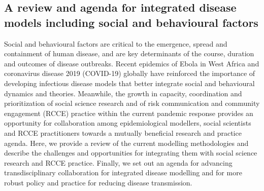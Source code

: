 \documentclass[a4paper,11pt]{scrartcl}
\begin{document}
\subsection{A review and agenda for integrated disease models including social and behavioural factors}
Social and behavioural factors are critical to the emergence, spread and containment of human disease, and are key determinants of the course, duration and outcomes of disease outbreaks. Recent epidemics of Ebola in West Africa and coronavirus disease 2019 (COVID-19) globally have reinforced the importance of developing infectious disease models that better integrate social and behavioural dynamics and theories. Meanwhile, the growth in capacity, coordination and prioritization of social science research and of risk communication and community engagement (RCCE) practice within the
current pandemic response provides an opportunity for collaboration among epidemiological modellers, social scientists and RCCE practitioners towards a mutually beneficial research and practice agenda. Here, we provide a review of the current modelling methodologies and describe the challenges and opportunities for integrating them with social science research and RCCE practice. Finally, we set out an agenda for advancing transdisciplinary collaboration for integrated disease modelling and for more robust policy and practice for reducing disease transmission.	
	
	  	
\printbibliography[heading=bibintoc, title={Bibliography}]
\end{document}
